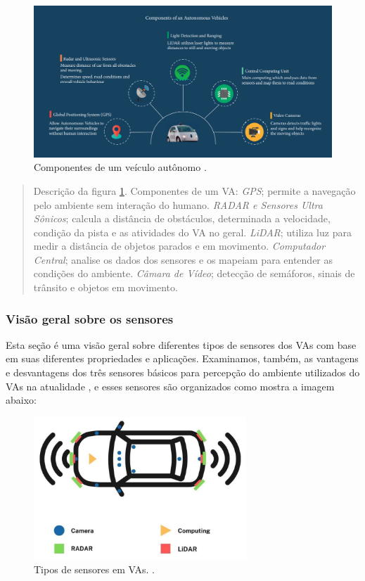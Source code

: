 \begin{figure}[H]
\centering
\includegraphics[width=\textwidth]{Figures/compo.png}
\caption{Componentes de um veículo autônomo \cite{aplicacao2}.}
\label{figura_compone}
\end{figure}

\begin{quote}
Descrição da figura \ref{figura_compone}. Componentes de um VA: \textit{GPS}; permite a navegação pelo ambiente sem interação do humano. \textit{RADAR e Sensores Ultra Sônicos}; calcula a distância de obstáculos, determinada a velocidade, condição da pista e as atividades do VA no geral. \textit{LiDAR}; utiliza luz para medir a distância de objetos parados e em movimento. \textit{Computador Central}; analise os dados dos sensores e os mapeiam para entender as condições do ambiente. \textit{Câmara de Vídeo}; detecção de semáforos, sinais de trânsito e objetos em movimento.
\end{quote}

 

\subsubsection{Visão geral sobre os sensores}

Esta seção é uma visão geral sobre diferentes tipos de sensores dos VAs com base em suas diferentes propriedades e aplicações. Examinamos, também, as vantagens e desvantagens dos três sensores básicos para percepção do ambiente utilizados do VAs na atualidade \cite{sensors}, e esses sensores são organizados como mostra a imagem abaixo:


\begin{figure}[H]
\centering
\includegraphics[width=8cm]{Figures/sensores.png}
\caption{Tipos de sensores em VAs. \cite{review-auto}.}
\label{figura-sensores}
\end{figure}


